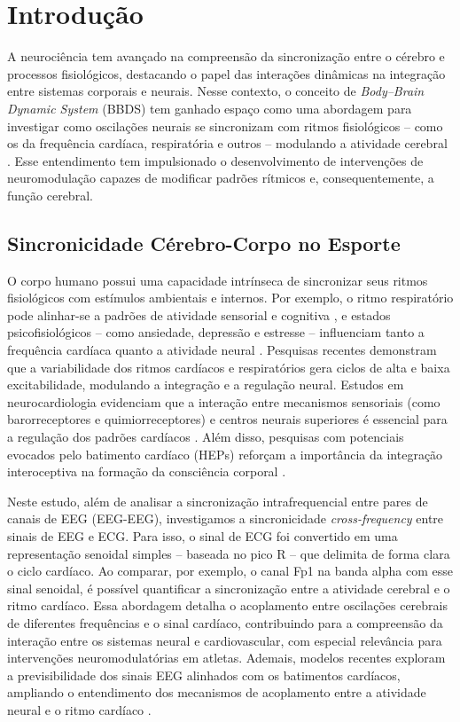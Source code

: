\chapter{Introdução}
\label{chap:introducao}

A neurociência tem avançado na compreensão da sincronização entre o cérebro e processos fisiológicos, destacando o papel das interações dinâmicas na integração entre sistemas corporais e neurais. Nesse contexto, o conceito de \textit{Body–Brain Dynamic System} (BBDS) tem ganhado espaço como uma abordagem para investigar como oscilações neurais se sincronizam com ritmos fisiológicos – como os da frequência cardíaca, respiratória e outros – modulando a atividade cerebral \cite{criscuolo2022cognition, cohen2017where}. Esse entendimento tem impulsionado o desenvolvimento de intervenções de neuromodulação capazes de modificar padrões rítmicos e, consequentemente, a função cerebral.

\section{Sincronicidade Cérebro-Corpo no Esporte}
O corpo humano possui uma capacidade intrínseca de sincronizar seus ritmos fisiológicos com estímulos ambientais e internos. Por exemplo, o ritmo respiratório pode alinhar-se a padrões de atividade sensorial e cognitiva \cite{haas1985effects}, e estados psicofisiológicos – como ansiedade, depressão e estresse – influenciam tanto a frequência cardíaca quanto a atividade neural \cite{criscuolo2022cognition}. Pesquisas recentes demonstram que a variabilidade dos ritmos cardíacos e respiratórios gera ciclos de alta e baixa excitabilidade, modulando a integração e a regulação neural. Estudos em neurocardiologia evidenciam que a interação entre mecanismos sensoriais (como barorreceptores e quimiorreceptores) e centros neurais superiores é essencial para a regulação dos padrões cardíacos \cite{marcondes2024linguagem}. Além disso, pesquisas com potenciais evocados pelo batimento cardíaco (HEPs) reforçam a importância da integração interoceptiva na formação da consciência corporal \cite{park2018neural, banelli2020skipping, mackinnon2013utilizing}.

Neste estudo, além de analisar a sincronização intrafrequencial entre pares de canais de EEG (EEG-EEG), investigamos a sincronicidade \textit{cross-frequency} entre sinais de EEG e ECG. Para isso, o sinal de ECG foi convertido em uma representação senoidal simples – baseada no pico R – que delimita de forma clara o ciclo cardíaco. Ao comparar, por exemplo, o canal Fp1 na banda alpha com esse sinal senoidal, é possível quantificar a sincronização entre a atividade cerebral e o ritmo cardíaco. Essa abordagem detalha o acoplamento entre oscilações cerebrais de diferentes frequências e o sinal cardíaco, contribuindo para a compreensão da interação entre os sistemas neural e cardiovascular, com especial relevância para intervenções neuromodulatórias em atletas. Ademais, modelos recentes exploram a previsibilidade dos sinais EEG alinhados com os batimentos cardíacos, ampliando o entendimento dos mecanismos de acoplamento entre a atividade neural e o ritmo cardíaco \cite{vergara2024exploring}.


